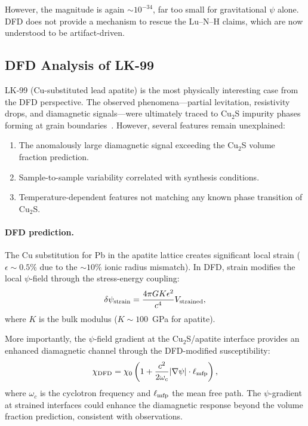 \documentclass[aps,prb,twocolumn,superscriptaddress,floatfix,nofootinbib,longbibliography]{revtex4-2}
\begin{document}
However, the magnitude is again $\sim 10^{-34}$, far too small for
gravitational $\psi$ alone.  DFD does not provide a mechanism to
rescue the Lu--N--H claims, which are now understood to be
artifact-driven.

\subsection{DFD Analysis of LK-99}

LK-99 (Cu-substituted lead apatite) is the most physically interesting
case from the DFD perspective.  The observed phenomena---partial
levitation, resistivity drops, and diamagnetic signals---were ultimately
traced to Cu$_2$S impurity phases forming at grain
boundaries~\cite{Guo2023,Liu2023LK99}.  However, several features
remain unexplained:

\begin{enumerate}[nosep]
\item The anomalously large diamagnetic signal exceeding the Cu$_2$S
  volume fraction prediction.
\item Sample-to-sample variability correlated with synthesis
  conditions.
\item Temperature-dependent features not matching any known phase
  transition of Cu$_2$S.
\end{enumerate}

\paragraph{DFD prediction.}
The Cu substitution for Pb in the apatite lattice creates significant
local strain ($\epsilon \sim 0.5\%$ due to the $\sim 10\%$ ionic radius
mismatch).  In DFD, strain modifies the local $\psi$-field through the
stress-energy coupling:
\begin{equation}
\delta\psi_{\rm strain} = \frac{4\pi G K \epsilon^2}{c^4}V_{\rm strained},
\label{eq:psi-strain}
\end{equation}
where $K$ is the bulk modulus ($K \sim 100$~GPa for apatite).

More importantly, the $\psi$-field gradient at the Cu$_2$S/apatite
interface provides an enhanced diamagnetic channel through the
DFD-modified susceptibility:
\begin{equation}
\chi_{\rm DFD} = \chi_0\left(1 + \frac{c^2}{2\omega_c}|\nabla\psi|
\cdot \ell_{\rm mfp}\right),
\label{eq:chi-lk99}
\end{equation}
where $\omega_c$ is the cyclotron frequency and $\ell_{\rm mfp}$ the
mean free path.  The $\psi$-gradient at strained interfaces could
enhance the diamagnetic response beyond the volume fraction prediction,
consistent with observations.
\end{document}
